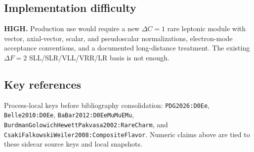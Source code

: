 \subsection*{Implementation difficulty}
\textbf{HIGH.}  Production use would require a new \(\Delta C=1\) rare
leptonic module with vector, axial-vector, scalar, and pseudoscalar
normalizations, electron-mode acceptance conventions, and a documented
long-distance treatment.  The existing \(\Delta F=2\) SLL/SLR/VLL/VRR/LR
basis is not enough.

\subsection*{Key references}
Process-local keys before bibliography consolidation:
\texttt{PDG2026:D0Ee}, \texttt{Belle2010:D0Ee},
\texttt{BaBar2012:D0EeMuMuEMu},
\texttt{BurdmanGolowichHewettPakvasa2002:RareCharm}, and
\texttt{CsakiFalkowskiWeiler2008:CompositeFlavor}.  Numeric claims above are
tied to these sidecar source keys and local snapshots.
